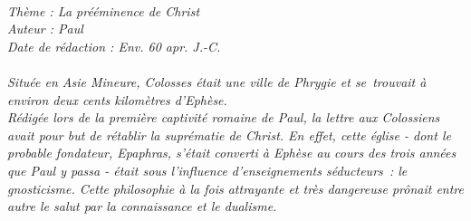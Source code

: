 \BFont
\noindent\hrulefill
{\footnotesize
\textit{
\bigskip
{\centering{}
\\Thème : La prééminence de Christ
\\Auteur : Paul
\\Date de rédaction : Env. 60 apr. J.-C.\\}
}
\textit{
\\Située en Asie Mineure, Colosses était une ville de Phrygie et se trouvait à environ deux cents kilomètres d’Ephèse.
\\Rédigée lors de la première captivité romaine de Paul, la lettre aux Colossiens avait pour but de rétablir la suprématie de Christ. En effet, cette église - dont le probable fondateur, Epaphras, s’était converti à Ephèse au cours des trois années que Paul y passa - était sous l’influence d’enseignements séducteurs : le gnosticisme. Cette philosophie à la fois attrayante et très dangereuse prônait entre autre le salut par la connaissance et le dualisme.\bigskip
}
}
\par\nobreak\noindent\hrulefill
